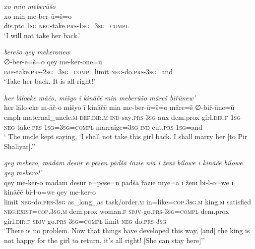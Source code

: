 \ea \label{ŽP.208}
\textit{xo min meberūšo} \\ 
\gll xo min me-ber-ū=š=o \\ 
 dis.ptc \textsc{1sg} \textsc{neg-}take\textsc{.prs}\textsc{-\textsc{1sg}}\textsc{=3sg}\textsc{=compl} \\ 
\glt `I will not take her back.'
\z 
 
\ea \label{ŽP.212}
\textit{berešo qey mekeronew} \\ 
\gll ∅-ber-e=š=o qey me-ker-one=ū \\ 
 \textsc{imp-}take\textsc{.prs}-\textsc{2sg}\textsc{=3sg}\textsc{=compl} limit \textsc{neg-}do\textsc{.prs}\textsc{-3sg}=and \\ 
\glt `Take her back. It is all right!'
\z 
 
\ea \label{ŽP.225}
\textit{her lāloeke māčo, mišyo ī kināčē min meberūšo māreš biřūnew’} \\ 
\gll her lālo-eke m-āč-o mišyo ī kināčē min me-ber-ū=š=o māre=š ∅-biř-ūne=ū \\ 
 emph maternal\_uncle\textsc{.m}\textsc{-def}\textsc{.dir}\textsc{.m} \textsc{ind-}say\textsc{.prs}\textsc{-3sg} aux dem.prox girl\textsc{.dir}\textsc{.f} \textsc{1sg} \textsc{neg-}take\textsc{.prs}\textsc{-\textsc{1sg}}\textsc{=3sg}\textsc{=compl} marraige\textsc{=3sg} \textsc{ind-}cut\textsc{.prs}\textsc{-\textsc{1sg}}=and \\ 
\glt ` The uncle kept saying, ‘I shall not take this girl back. I shall marry her [to Pir Shaliyar].’'
\z 
 
\ea \label{ŽP.242}
\textit{qey mekero, mādām desūr e pēsen pādšā řāzīe nīā ī ženī bilowe ī kināčē bilowe qey mekero!’} \\ 
\gll qey me-ker-o mādām desūr e=pēse=n pādšā řāzīe nīye=ā ī ženī bi-l-o=we ī kināčē bi-l-o=we qey me-ker-o \\ 
 limit \textsc{neg-}do\textsc{.prs}\textsc{-3sg} as\_long\_as task/order\textsc{.m} in=like\textsc{=cop}\textsc{.3sg}\textsc{.m} king\textsc{.m} satisfied \textsc{\textsc{neg.}exist}\textsc{=cop}\textsc{.3sg}\textsc{.m} dem.prox woman\textsc{.f} \textsc{sbjv-}go\textsc{.prs}\textsc{-3sg}\textsc{=compl} dem.prox girl\textsc{.dir}\textsc{.f} \textsc{sbjv-}go\textsc{.prs}\textsc{-3sg}\textsc{=compl} limit \textsc{neg-}do\textsc{.prs}\textsc{-3sg} \\ 
\glt `There is no problem. Now that things have developed this way, [and] the king is not happy for the girl to return, it’s all right! [She can stay here]’'
\z 
 
